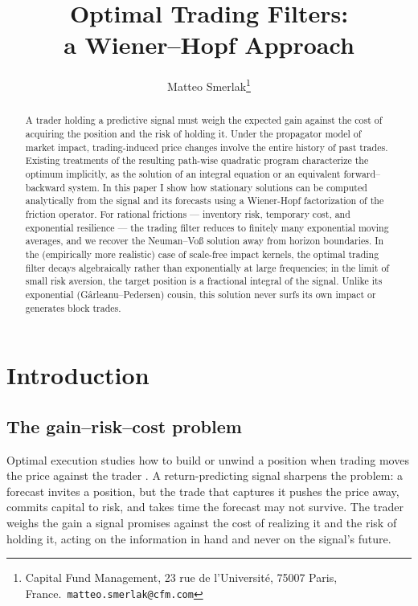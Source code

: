 \documentclass[11pt]{article}
\title{Optimal Trading Filters:\\ a Wiener--Hopf Approach}
\author{Matteo Smerlak\thanks{Capital Fund Management, 23 rue de l'Universit\'e, 75007 Paris, France.\ \texttt{matteo.smerlak@cfm.com}}}
\date{}
\theoremstyle{plain}
\theoremstyle{definition}
\theoremstyle{remark}
\begin{document}
\maketitle


\begin{abstract}
A trader holding a predictive signal must weigh the expected gain against the cost of acquiring the position and the risk of holding it. Under the propagator model of market impact, trading-induced price changes involve the entire history of past trades. Existing treatments of the resulting path-wise quadratic program characterize the optimum implicitly, as the solution of an integral equation or an equivalent forward--backward system. In this paper I show how stationary solutions can be computed analytically from the signal and its forecasts using a Wiener-Hopf factorization of the friction operator. For rational frictions --- inventory risk, temporary cost, and exponential resilience --- the trading filter reduces to finitely many exponential moving averages, and we recover the Neuman--Vo\ss{} solution away from horizon boundaries. In the (empirically more realistic) case of scale-free impact kernels, the optimal trading filter decays algebraically rather than exponentially at large frequencies; in the limit of small risk aversion, the target position is a fractional integral of the signal. Unlike its exponential (G\^arleanu--Pedersen) cousin, this solution never surfs its own impact or generates block trades.
\end{abstract}

\section{Introduction}\label{sec:intro}

\subsection{The gain--risk--cost problem}\label{sec:problem}

Optimal execution studies how to build or unwind a position when trading moves the price against the trader \citep{AlmgrenChriss2001,GatheralSchiedSlynko2012}. A return-predicting signal sharpens the problem: a forecast invites a position, but the trade that captures it pushes the price away, commits capital to risk, and takes time the forecast may not survive. The trader weighs the gain a signal promises against the cost of realizing it and the risk of holding it, acting on the information in hand and never on the signal's future.
\end{document}
